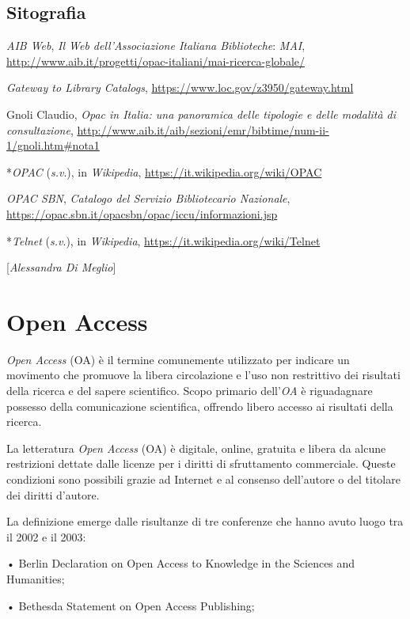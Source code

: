 {\section*{Sitografia}
{\parindent0pt 
\emph{AIB Web}, \emph{Il Web dell'Associazione Italiana Biblioteche}:
\emph{MAI},
\url{http://www.aib.it/progetti/opac-italiani/mai-ricerca-globale/}

\emph{Gateway to Library Catalogs},
\url{https://www.loc.gov/z3950/gateway.html}

Gnoli Claudio, \emph{Opac in Italia: una panoramica delle tipologie e
delle modalità di consultazione},
\url{http://www.aib.it/aib/sezioni/emr/bibtime/num-ii-1/gnoli.htm\#nota1}

*\emph{OPAC} (\emph{s.v}.), in \emph{Wikipedia},
\url{https://it.wikipedia.org/wiki/OPAC}

\emph{OPAC SBN}, \emph{Catalogo del Servizio Bibliotecario Nazionale},
\url{https://opac.sbn.it/opacsbn/opac/iccu/informazioni.jsp}

*\emph{Telnet} (\emph{s.v}.), in \emph{Wikipedia},
\url{https://it.wikipedia.org/wiki/Telnet}
}

\hrulefill 

{[}\emph{Alessandra Di Meglio}{]}




\chapter{Open Access}

\emph{Open Access} (OA) è il termine comunemente utilizzato per indicare
un movimento che promuove la libera circolazione e l'uso non restrittivo
dei risultati della ricerca e del sapere scientifico. Scopo primario
dell'\emph{OA} è riguadagnare possesso della comunicazione scientifica,
offrendo libero accesso ai risultati della ricerca.

La letteratura \emph{Open Access} (OA) è digitale, online, gratuita e
libera da alcune restrizioni dettate dalle licenze per i diritti di
sfruttamento commerciale. Queste condizioni sono possibili grazie ad
Internet e al consenso dell'autore o del titolare dei diritti d'autore.

La definizione emerge dalle risultanze di tre conferenze che hanno avuto
luogo tra il 2002 e il 2003:

• Berlin Declaration on Open Access to Knowledge in the Sciences and
Humanities;

• Bethesda Statement on Open Access Publishing;

}
